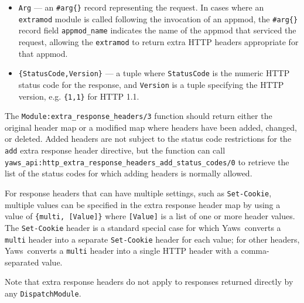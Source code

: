\documentclass[11pt,oneside,english]{book}
\newcommand{\Yaws}            %
        {{\sc Yaws}}
\begin{document}
\begin{itemize}
\begin{itemize}
\begin{itemize}
                    \item \verb+Arg+ --- an \verb+#arg{}+ record
                      representing the request. In cases where an
                      \verb+extramod+ module is called following the
                      invocation of an appmod, the \verb+#arg{}+
                      record field \verb+appmod_name+ indicates the
                      name of the appmod that serviced the request,
                      allowing the \verb+extramod+ to return extra
                      HTTP headers appropriate for that appmod.

                    \item \verb+{StatusCode,Version}+ --- a tuple
                      where \verb+StatusCode+ is the numeric HTTP
                      status code for the response, and \verb+Version+
                      is a tuple specifying the HTTP version,
                      e.g. \verb+{1,1}+ for HTTP 1.1.
                  \end{itemize}

                  The \verb+Module:extra_response_headers/3+ function
                  should return either the original header map or a
                  modified map where headers have been added, changed,
                  or deleted. Added headers are not subject to the
                  status code restrictions for the \verb+add+ extra
                  response header directive, but the function can call
                  \verb+yaws_api:http_extra_response_headers_add_status_codes/0+
                  to retrieve the list of the status codes for which
                  adding headers is normally allowed.

                  For response headers that can have multiple
                  settings, such as \verb+Set-Cookie+, multiple values
                  can be specified in the extra response header map by
                  using a value of \verb+{multi, [Value]}+ where
                  \verb+[Value]+ is a list of one or more header
                  values. The \verb+Set-Cookie+ header is a standard
                  special case for which \Yaws\ converts a
                  \verb+multi+ header into a separate
                  \verb+Set-Cookie+ header for each value; for other
                  headers, \Yaws\ converts a \verb+multi+ header into
                  a single HTTP header with a comma-separated value.
              \end{itemize}

              Note that extra response headers do not apply to
              responses returned directly by any
              \verb+DispatchModule+.


\end{itemize}
\end{document}
